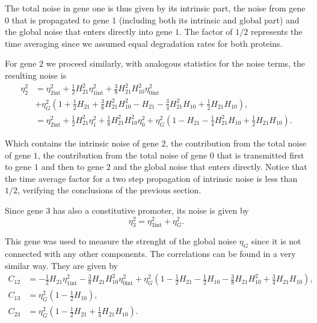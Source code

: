 The total noise in gene one is thus given by its intrinsic part, the noise from gene $0$ that is propagated to gene $1$ (including both its intrinsic and global part) and the global noise that enters directly into gene $1$. The factor of $1/2$ represents the time averaging since we assumed equal degradation rates for both proteins.

For gene $2$ we proceed similarly, with analogous statistics for the noise terms, the resulting noise is
\begin{equation}
  \label{eq:etagene2}
  \begin{split}
    \eta_2^2 &= \eta_{2\text{int}}^2 +  \frac{1}{2}H_{21}^2\eta_{1\text{int}}^2+\frac{3}{8}H_{21}^2H_{10}^2\eta_{0\text{int}}^2\\
    &+\eta_G^2\left(1 + \frac{1}{2}H_{21} + \frac{3}{8}H_{21}^2H_{10}^2 - H_{21} -\frac{3}{4}H_{21}^2H_{10} + \frac{1}{2}H_{21}H_{10}\right),\\
    &= \eta_{2\text{int}}^2 + \frac{1}{2}H_{21}^2\eta_1^2+\frac{1}{8}H_{21}^2H_{10}^2\eta_0^2+\eta_G^2\left(1-H_{21}-\frac{1}{4}H_{21}^2H_{10}+\frac{1}{2}H_{21}H_{10}\right).
  \end{split}
\end{equation}

Which contains the intrinsic noise of gene $2$, the contribution from the total noise of gene $1$, the contribution from the total noise of gene $0$ that is transmitted first to gene $1$ and then to gene $2$ and the global noise that enters directly. Notice that the time average factor for a two step propagation of intrinsic noise is less than $1/2$, verifying the conclusions of the previous section.

Since gene $3$ has also a constitutive promoter, its noise is given by
\begin{equation}
  \label{eq:etagene3}
  \eta_3^2 = \eta_{3\text{int}}^2+\eta_G^2.
\end{equation}

This gene was used to measure the strenght of the global noise $\eta_G$ since it is not connected with any other components. The correlations can be found in a very similar way. They are given by
\begin{equation}
  \label{eq:lan-correl}
  \begin{split}
    C_{12}&=-\frac{1}{2}H_{21}\eta_{1\text{int}}^2 -\frac{3}{8}H_{21}H_{10}^2\eta_{0\text{int}}^2+\eta_G^2\left(1-\frac{1}{2}H_{21}-\frac{1}{2}H_{10}-\frac{3}{8}H_{21}H_{10}^2 + \frac{3}{4}H_{21}H_{10}\right),\\
    C_{13}&=\eta_G^2\left(1-\frac{1}{2}H_{10}\right),\\
    C_{23}&=\eta_G^2\left(1-\frac{1}{2}H_{21}+\frac{1}{4}H_{21}H_{10}\right).
  \end{split}
\end{equation}

